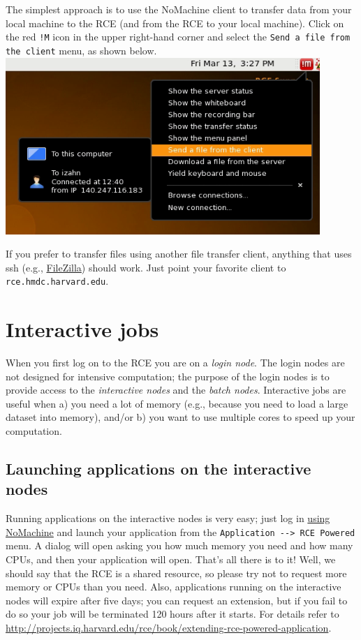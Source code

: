 \documentclass[11pt]{article}
\begin{document}
The simplest approach is to use the NoMachine client to transfer data from your local machine to the RCE (and from the RCE to your local machine). Click on the red \texttt{!M} icon in the upper right-hand corner and select the \texttt{Send a file from the client} menu, as shown below.
\includegraphics[width=.9\linewidth]{images/NoMachineMenu.png}

If you prefer to transfer files using another file transfer client, anything that uses ssh (e.g., \href{http://filezilla-project.org/}{FileZilla}) should work. Just point your favorite client to \texttt{rce.hmdc.harvard.edu}.

\section{Interactive jobs}
\label{sec-6}
When you first log on to the RCE you are on a \emph{login node}. The login nodes are not designed for intensive computation; the purpose of the login nodes is to provide access to the \emph{interactive nodes} and the \emph{batch nodes}. Interactive jobs are useful when a) you need a lot of memory (e.g., because you need to load a large dataset into memory), and/or b) you want to use multiple cores to speed up your computation.

\subsection{Launching applications on the interactive nodes}
\label{sec-6-1}
Running applications on the interactive nodes is very easy; just log in \hyperref[sec-2]{using NoMachine} and launch your application from the \texttt{Application -{}-> RCE Powered} menu. A dialog will open asking you how much memory you need and how many CPUs, and then your application will open. That's all there is to it! Well, we should say that the RCE is a shared resource, so please try not to request more memory or CPUs than you need. Also, applications running on the interactive nodes will expire after five days; you can request an extension, but if you fail to do so your job will be terminated 120 hours after it starts. For details refer to \url{http://projects.iq.harvard.edu/rce/book/extending-rce-powered-application}.
\end{document}
